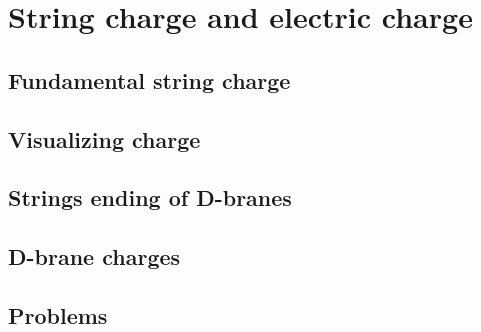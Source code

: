 \documentclass[12pt]{report}
\begin{document}
\chapter{String charge and electric charge}
\newpage
\section{Fundamental string charge}
\section{Visualizing charge}
\section{Strings ending of D-branes}
\section{D-brane charges}
\section{Problems}
\end{document}
